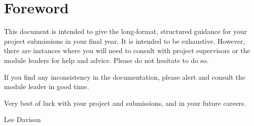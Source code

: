 \chapter{Foreword}

This document is intended to give the long-format, structured guidance for your project submissions in your final year. It is intended to be exhaustive. However, there are instances where you will need to consult with project supervisors or the module leaders for help and advice. Please do not hesitate to do so. 

If you find any inconsistency in the documentation, please alert and consult the module leader in good time. 

Very best of luck with your project and submissions, and in your future careers.

\medskip

Lee Davison

